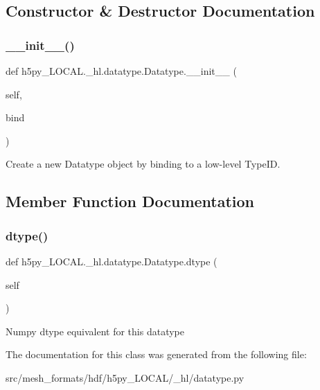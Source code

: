 \subsection{Constructor \& Destructor Documentation}
\mbox{\label{classh5py__LOCAL_1_1__hl_1_1datatype_1_1Datatype_a37491aeee328996fb79fadce9c3f30bc}} 
\subsubsection{\texorpdfstring{\+\_\+\+\_\+init\+\_\+\+\_\+()}{\_\_init\_\_()}}
{\footnotesize\ttfamily def h5py\+\_\+\+L\+O\+C\+A\+L.\+\_\+hl.\+datatype.\+Datatype.\+\_\+\+\_\+init\+\_\+\+\_\+ (\begin{DoxyParamCaption}\item[{}]{self,  }\item[{}]{bind }\end{DoxyParamCaption})}

\begin{DoxyVerb}Create a new Datatype object by binding to a low-level TypeID.
\end{DoxyVerb}
 

\subsection{Member Function Documentation}
\mbox{\label{classh5py__LOCAL_1_1__hl_1_1datatype_1_1Datatype_a76f08784e54e27eac847f1b69482a93b}} 
\subsubsection{\texorpdfstring{dtype()}{dtype()}}
{\footnotesize\ttfamily def h5py\+\_\+\+L\+O\+C\+A\+L.\+\_\+hl.\+datatype.\+Datatype.\+dtype (\begin{DoxyParamCaption}\item[{}]{self }\end{DoxyParamCaption})}

\begin{DoxyVerb}Numpy dtype equivalent for this datatype\end{DoxyVerb}
 

The documentation for this class was generated from the following file\+:\begin{DoxyCompactItemize}
\item 
src/mesh\+\_\+formats/hdf/h5py\+\_\+\+L\+O\+C\+A\+L/\+\_\+hl/datatype.\+py\end{DoxyCompactItemize}
